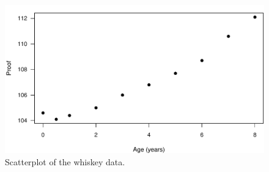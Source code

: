 \documentclass[cmfont,usenames,dvipsnames,leqno]{afit-etd}\usepackage[]{graphicx}\usepackage[]{color}
\makeatletter
\def\maxwidth{ %
  \ifdim\Gin@nat@width>\linewidth
    \linewidth
  \else
    \Gin@nat@width
  \fi
}
\newenvironment{kframe}{%
 \def\at@end@of@kframe{}%
 \ifinner\ifhmode%
  \def\at@end@of@kframe{\end{minipage}}%
  \begin{minipage}{\columnwidth}%
 \fi\fi%
 \def\FrameCommand##1{\hskip\@totalleftmargin \hskip-\fboxsep
 \colorbox{shadecolor}{##1}\hskip-\fboxsep
     \hskip-\linewidth \hskip-\@totalleftmargin \hskip\columnwidth}%
 \MakeFramed {\advance\hsize-\width
   \@totalleftmargin\z@ \linewidth\hsize
   \@setminipage}}%
 {\par\unskip\endMakeFramed%
 \at@end@of@kframe}
\newenvironment{knitrout}{}{} %
\renewenvironment{knitrout}{\begin{singlespace}}{\end{singlespace}}
\makeatother
\begin{document}
\begin{knitrout}
\color{fgcolor}\begin{kframe}


{\ttfamily\noindent\itshape\color{messagecolor}{\#\# Loading required package: rootSolve}}\end{kframe}\begin{figure}[H]

\includegraphics[width=\maxwidth]{figure/whiskey-scatter} \caption[Scatterplot of the whiskey data]{Scatterplot of the whiskey data.\label{fig:whiskey-scatter}}
\end{figure}


\end{knitrout}
\end{document}
